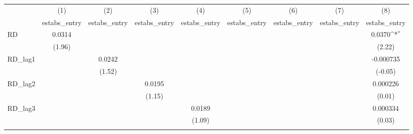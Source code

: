 {
\def\sym#1{\ifmmode^{#1}\else\(^{#1}\)\fi}
\begin{tabular}{l*{8}{c}}
\toprule
            &\multicolumn{1}{c}{(1)}&\multicolumn{1}{c}{(2)}&\multicolumn{1}{c}{(3)}&\multicolumn{1}{c}{(4)}&\multicolumn{1}{c}{(5)}&\multicolumn{1}{c}{(6)}&\multicolumn{1}{c}{(7)}&\multicolumn{1}{c}{(8)}\\
            &\multicolumn{1}{c}{estabs\_entry}&\multicolumn{1}{c}{estabs\_entry}&\multicolumn{1}{c}{estabs\_entry}&\multicolumn{1}{c}{estabs\_entry}&\multicolumn{1}{c}{estabs\_entry}&\multicolumn{1}{c}{estabs\_entry}&\multicolumn{1}{c}{estabs\_entry}&\multicolumn{1}{c}{estabs\_entry}\\
\midrule
RD          &      0.0314         &                     &                     &                     &                     &                     &                     &      0.0370\sym{*}  \\
            &      (1.96)         &                     &                     &                     &                     &                     &                     &      (2.22)         \\
\addlinespace
RD\_lag1     &                     &      0.0242         &                     &                     &                     &                     &                     &   -0.000735         \\
            &                     &      (1.52)         &                     &                     &                     &                     &                     &     (-0.05)         \\
\addlinespace
RD\_lag2     &                     &                     &      0.0195         &                     &                     &                     &                     &    0.000226         \\
            &                     &                     &      (1.15)         &                     &                     &                     &                     &      (0.01)         \\
\addlinespace
RD\_lag3     &                     &                     &                     &      0.0189         &                     &                     &                     &    0.000334         \\
            &                     &                     &                     &      (1.09)         &                     &                     &                     &      (0.03)         \\
\addlinespace

\end{tabular}}
